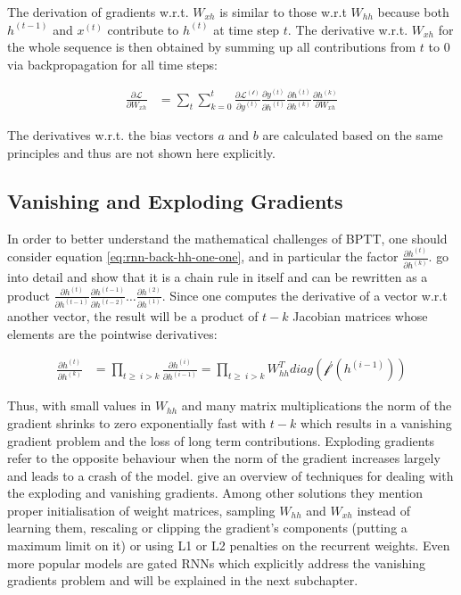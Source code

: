 \documentclass[]{krantz}
\begin{document}
The derivation of gradients w.r.t. \(W_{xh}\) is similar to those w.r.t \(W_{hh}\) because both \(h^{(t-1)}\) and \(x^{(t)}\) contribute to \(h^{(t)}\) at time step \(t\). The derivative w.r.t. \(W_{xh}\) for the whole sequence is then obtained by summing up all contributions from \(t\) to \(0\) via backpropagation for all time steps:

\begin{align}
\frac{\partial \mathcal{L}}{\partial W_{xh}}
& = \sum_{t} \sum_{k=0}^{t} \frac{\partial \mathcal{L^{(t)}}}{\partial y^{(t)}} \frac{\partial y^{(t)}}{\partial h^{(t)}} \frac{\partial h^{(t)}}{\partial h^{(k)}} \frac{\partial h^{(k)}}{\partial W_{xh}} \label{eq:rnn-back-xh-all}
\end{align}

The derivatives w.r.t. the bias vectors \(a\) and \(b\) are calculated based on the same principles and thus are not shown here explicitly.

\hypertarget{vanishing-and-exploding-gradients}{%
\subsection{Vanishing and Exploding Gradients}\label{vanishing-and-exploding-gradients}}

In order to better understand the mathematical challenges of BPTT, one should consider equation \eqref{eq:rnn-back-hh-one-one}, and in particular the factor \(\frac{\partial h^{(t)}}{\partial h^{(k)}}\). \citet{pascanu2013difficulty} go into detail and show that it is a chain rule in itself and can be rewritten as a product \(\frac{\partial h^{(t)}}{\partial h^{(t-1)}} \frac{\partial h^{(t-1)}}{\partial h^{(t-2)}} \ldots \frac{\partial h^{(2)}}{\partial h^{(1)}}\). Since one computes the derivative of a vector w.r.t another vector, the result will be a product of \(t-k\) Jacobian matrices whose elements are the pointwise derivatives:

\begin{align}
\frac{\partial h^{(t)}}{\partial h^{(k)}}
& = \prod_{t\geq\ i>k}^{} \frac{\partial h^{(i)}}{\partial h^{(i-1)}}
= \prod_{t\geq\ i>k}^{} W_{hh}^{T}diag(\mathcal{f}^{'}(h^{(i-1)}))  \label{eq:rnn-back-vanishing}
\end{align}

Thus, with small values in \(W_{hh}\) and many matrix multiplications the norm of the gradient shrinks to zero exponentially fast with \(t-k\) which results in a vanishing gradient problem and the loss of long term contributions. Exploding gradients refer to the opposite behaviour when the norm of the gradient increases largely and leads to a crash of the model. \citet{pascanu2013difficulty} give an overview of techniques for dealing with the exploding and vanishing gradients. Among other solutions they mention proper initialisation of weight matrices, sampling \(W_{hh}\) and \(W_{xh}\) instead of learning them, rescaling or clipping the gradient's components (putting a maximum limit on it) or using L1 or L2 penalties on the recurrent weights. Even more popular models are gated RNNs which explicitly address the vanishing gradients problem and will be explained in the next subchapter.
\end{document}
